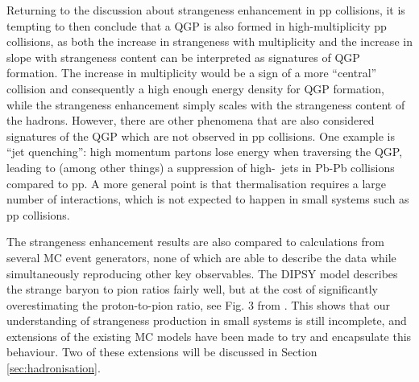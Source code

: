       Returning to the discussion about strangeness enhancement in pp collisions, it is tempting to then conclude that a QGP is also formed in high-multiplicity pp collisions, as both the increase in strangeness with multiplicity and the increase in slope with strangeness content can be interpreted as signatures of QGP formation. The increase in multiplicity would be a sign of a more ``central'' collision and consequently a high enough energy density for QGP formation, while the strangeness enhancement simply scales with the strangeness content of the hadrons. However, there are other phenomena that are also considered signatures of the QGP which are not observed in pp collisions.  One example is ``jet quenching'': high momentum partons lose energy when traversing the QGP, leading to (among other things) a suppression of high-\pt\ jets in Pb-Pb collisions compared to pp. \cite{JetQuenchAlice} A more general point is that thermalisation requires a large number of interactions, which is not expected to happen in small systems such as pp collisions. 

      The strangeness enhancement results are also compared to calculations from several MC event generators, none of which are able to describe the data while simultaneously reproducing other key observables. The DIPSY model %
      describes the strange baryon to pion ratios fairly well, but at the cost of significantly overestimating the proton-to-pion ratio, see Fig. 3 from \cite{StrangenessEnhancement}. This shows that our understanding of strangeness production in small systems is still incomplete, and extensions of the existing MC models have been made to try and encapsulate this behaviour. Two of these extensions will be discussed in Section \ref{sec:hadronisation}. 

